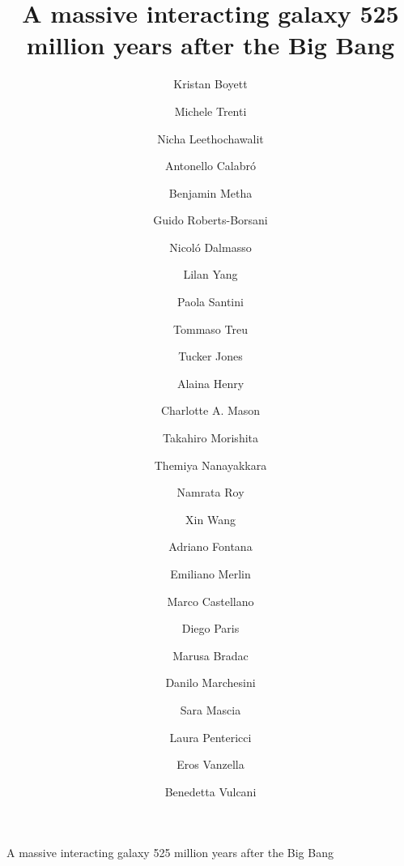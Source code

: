 \documentclass[sn-mathphys]{sn-jnl}%
\theoremstyle{thmstyleone}%
\theoremstyle{thmstyletwo}%
\theoremstyle{thmstylethree}%
\begin{document}
\title{A massive interacting galaxy 525 million years after the Big Bang}{A massive interacting galaxy 525 million years after the Big Bang}




\author*[1,2]{Kristan Boyett}
\author*[1,2]{Michele Trenti}
\author[3]{Nicha Leethochawalit} 

\author[4]{Antonello Calabr\'o} 
\author[1,2,5]{Benjamin Metha} 

\author[5]{Guido Roberts-Borsani}
\author[1,2]{Nicol\'o Dalmasso} 
\author[6]{Lilan Yang} 
\author[4]{Paola Santini}

\author[5]{Tommaso Treu}
\author[7]{Tucker Jones}
\author[8,9]{Alaina Henry}

\author[10,11]{Charlotte A. Mason}
\author[12]{Takahiro Morishita}
\author[13]{Themiya Nanayakkara}

\author[9]{Namrata Roy}
\author[14,15,16]{Xin Wang}

\author[4]{Adriano Fontana}
\author[4]{Emiliano Merlin}
\author[4]{Marco Castellano}
\author[4]{Diego Paris}

\author[17,7]{Marusa Bradac}
\author[18]{Danilo Marchesini}
\author[4]{Sara Mascia}
\author[4]{Laura Pentericci}
\author[19]{Eros Vanzella}
\author[20]{Benedetta Vulcani}
\end{document}
